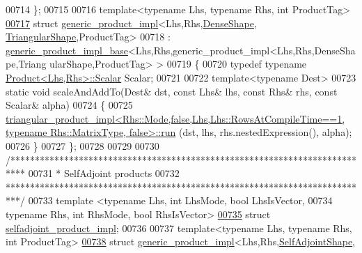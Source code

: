 \begin{DoxyCode}
00714 \};
00715 
00716 \textcolor{keyword}{template}<\textcolor{keyword}{typename} Lhs, \textcolor{keyword}{typename} Rhs, \textcolor{keywordtype}{int} ProductTag>
\hyperlink{struct_eigen_1_1internal_1_1generic__product__impl_3_01_lhs_00_01_rhs_00_01_dense_shape_00_01_tre6f7b1bb2806815b569967282a3d5cae}{00717} \textcolor{keyword}{struct }\hyperlink{struct_eigen_1_1internal_1_1generic__product__impl}{generic\_product\_impl}<Lhs,Rhs,\hyperlink{struct_eigen_1_1_dense_shape}{DenseShape},
      \hyperlink{struct_eigen_1_1_triangular_shape}{TriangularShape},ProductTag>
00718 : \hyperlink{struct_eigen_1_1internal_1_1generic__product__impl__base}{generic\_product\_impl\_base}<Lhs,Rhs,generic\_product\_impl<Lhs,Rhs,DenseShape,Triang
      ularShape,ProductTag> >
00719 \{
00720   \textcolor{keyword}{typedef} \textcolor{keyword}{typename} \hyperlink{group___core___module_class_eigen_1_1_product}{Product<Lhs,Rhs>::Scalar} Scalar;
00721   
00722   \textcolor{keyword}{template}<\textcolor{keyword}{typename} Dest>
00723   \textcolor{keyword}{static} \textcolor{keywordtype}{void} scaleAndAddTo(Dest& dst, \textcolor{keyword}{const} Lhs& lhs, \textcolor{keyword}{const} Rhs& rhs, \textcolor{keyword}{const} Scalar& alpha)
00724   \{
00725     
      \hyperlink{struct_eigen_1_1internal_1_1triangular__product__impl}{triangular\_product\_impl<Rhs::Mode,false,Lhs,Lhs::RowsAtCompileTime==1, typename Rhs::MatrixType,
       false>::run}
      (dst, lhs, rhs.nestedExpression(), alpha);
00726   \}
00727 \};
00728 
00729 
00730 \textcolor{comment}{/***************************************************************************}
00731 \textcolor{comment}{* SelfAdjoint products}
00732 \textcolor{comment}{***************************************************************************/}
00733 \textcolor{keyword}{template} <\textcolor{keyword}{typename} Lhs, \textcolor{keywordtype}{int} LhsMode, \textcolor{keywordtype}{bool} LhsIsVector,
00734           \textcolor{keyword}{typename} Rhs, \textcolor{keywordtype}{int} RhsMode, \textcolor{keywordtype}{bool} RhsIsVector>
\hyperlink{struct_eigen_1_1internal_1_1selfadjoint__product__impl}{00735} \textcolor{keyword}{struct }\hyperlink{struct_eigen_1_1internal_1_1selfadjoint__product__impl}{selfadjoint\_product\_impl};
00736 
00737 \textcolor{keyword}{template}<\textcolor{keyword}{typename} Lhs, \textcolor{keyword}{typename} Rhs, \textcolor{keywordtype}{int} ProductTag>
\hyperlink{struct_eigen_1_1internal_1_1generic__product__impl_3_01_lhs_00_01_rhs_00_01_self_adjoint_shape_06e3f81c44c9a89e35e47ffcd48d159f9}{00738} \textcolor{keyword}{struct }\hyperlink{struct_eigen_1_1internal_1_1generic__product__impl}{generic\_product\_impl}<Lhs,Rhs,\hyperlink{struct_eigen_1_1_self_adjoint_shape}{SelfAdjointShape},

\end{DoxyCode}
